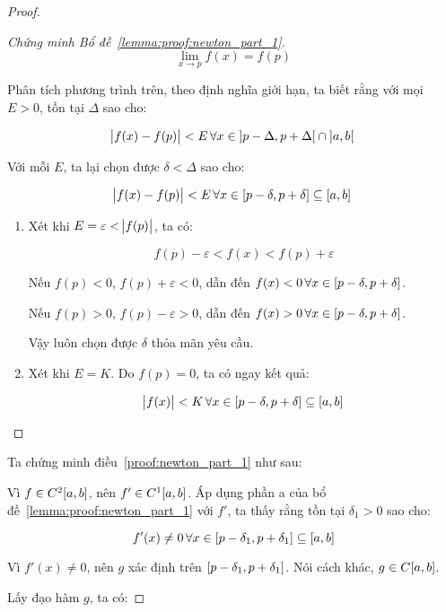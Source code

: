 \documentclass[../../Lectures.tex]{subfiles}
\begin{document}
\begin{proof}
\begin{proof}[Chứng minh Bổ đề~\ref{lemma:proof:newton_part_1}]
        \[\lim_{x \to p} f(x) = f(p)\]

        Phân tích phương trình trên, theo định nghĩa giới hạn, ta biết rằng với
        mọi \(E > 0\), tồn tại \(\Delta\) sao cho:

        \[\abs{f(x) - f(p)} < E \, \forall x \in \interval[open]{p - \Delta}{p + \Delta} \cap \interval[open]{a}{b}\]

        Với mỗi \(E\), ta lại chọn được \(\delta < \Delta\) sao cho:

        \[\abs{f(x) - f(p)} < E \, \forall x \in \interval{p - \delta}{p + \delta} \subseteq \interval{a}{b}\]

        \begin{enumerate}[label = (\alph*)]
            \item Xét khi \(E = \varepsilon < \abs{f(p)}\), ta có:

                \[f(p) - \varepsilon < f(x) < f(p) + \varepsilon\]

                Nếu \(f(p) < 0\), \(f(p) + \varepsilon < 0\), dẫn đến \(f(x) < 0
                \, \forall x \in \interval{p - \delta}{p + \delta}\).

                Nếu \(f(p) > 0\), \(f(p) - \varepsilon > 0\), dẫn đến \(f(x) > 0
                \, \forall x \in \interval{p - \delta}{p + \delta}\).

                Vậy luôn chọn được \(\delta\) thỏa mãn yêu cầu.

            \item Xét khi \(E = K\). Do \(f(p) = 0\), ta có ngay kết quả:

                \[\abs{f(x)} < K \, \forall x \in \interval{p - \delta}{p + \delta} \subseteq \interval{a}{b}\]
        \end{enumerate}
    \end{proof}

    Ta chứng minh điều~\ref{proof:newton_part_1} như sau:

    Vì \(f \in C^2 \interval{a}{b}\), nên \(f' \in C^1 \interval{a}{b}\). Áp
    dụng phần a của bổ đề~\ref{lemma:proof:newton_part_1} với \(f'\), ta thấy
    rằng tồn tại \(\delta_1 > 0\) sao cho:

    \[f'(x) \neq 0 \, \forall x \in \interval{p - \delta_1}{p + \delta_1} \subseteq \interval{a}{b}\]

    Vì \(f'(x) \neq 0\), nên \(g\) xác định trên \(\interval{p - \delta_1}{p +
    \delta_1}\). Nói cách khác, \(g \in C \interval{a}{b}\).

    Lấy đạo hàm \(g\), ta có:


\end{proof}
\end{document}
